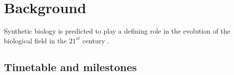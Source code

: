 \documentclass[11pt,twoside]{article}
\begin{document}
\newpage
\clearpage
\setcounter{page}{1}

\section{Background}
Synthetic biology is predicted to play a defining role in the evolution of the biological field in the $21^{st}$ century \cite{Voigt:2006kd}.

\clearpage
\newpage



%

\clearpage
\newpage

\begin{landscape}

\section{Timetable and milestones}

\begin{center}
  \begin{gantt}[xunitlength=2cm]{5}{8}
  	\begin{ganttitle}
  	\end{ganttitle}
  \end{gantt}
\end{center}
\end{landscape}
\end{document}

